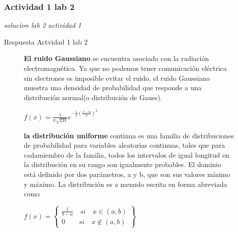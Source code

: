\subsubsection{Actividad 1 lab 2}
\begin{frame}{}


\begin{block}{}
	\centering
	\vspace{1mm}
	\large{\textit{solucion lab 2 actividad 1}}
	\vspace{1mm}
\end{block}
\end{frame}


\begin{frame}{Respuesta Actvidad 1 lab 2}
\begin{figure}[H]
\begin{flushleft}
\textbf{El ruido Gaussiano} se encuentra asociado con la radiación electromagnética. Ya que no podemos tener comunicación eléctrica sin electrones es imposible evitar el ruido, el ruido Gaussiano muestra una densidad de probabilidad que responde a una distribución normal(o distribución de Gauss).
\end{flushleft}
$f(x)={ \frac { 1 }{ \sigma \sqrt { 2\Pi  }  } e }^{ -\frac { 1 }{ 2 } { \left( \frac { x-u }{ \sigma  }  \right)  }^{ 2 } }$
\begin{flushleft}
\textbf{la distribución uniforme }continua es una familia de distribuciones de probabilidad para variables aleatorias continuas, tales que para cadamiembro de la familia, todos los intervalos de igual longitud en la distribución en su rango son igualmente probables. El dominio está definido por dos parámetros, a y b, que son sus valores mínimo y máximo. La distribución es a menudo escrita en forma abreviada como
\end{flushleft}
$f(x)=\left\{ \begin{matrix} \frac { 1 }{ b-a } \quad si\quad x\in (a,b) \\ 0\qquad si\quad x\notin (a,b) \end{matrix} \right\} $

\end{figure}
\end{frame}

